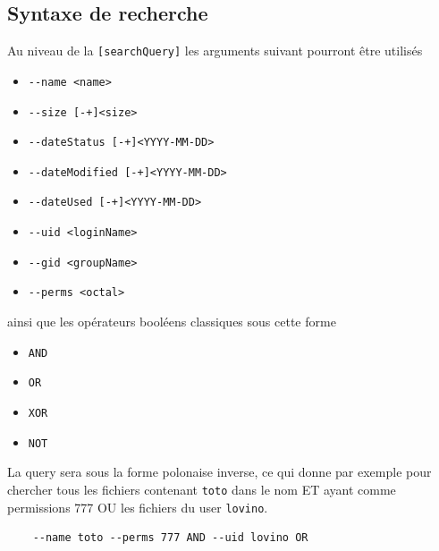 \documentclass[a4paper]{article}
\begin{document}
\subsection{Syntaxe de recherche}
Au niveau de la \verb+[searchQuery]+ les arguments suivant pourront être utilisés
\begin{itemize}
	\item \verb/--name <name>/
	\item \verb/--size [-+]<size>/
	\item \verb/--dateStatus [-+]<YYYY-MM-DD>/
	\item \verb/--dateModified [-+]<YYYY-MM-DD>/
	\item \verb/--dateUsed [-+]<YYYY-MM-DD>/
	\item \verb/--uid <loginName>/
	\item \verb/--gid <groupName>/
	\item \verb/--perms <octal>/
\end{itemize}
ainsi que les opérateurs booléens classiques sous cette forme
\begin{itemize}
	\item \verb+AND+
	\item \verb+OR+
	\item \verb+XOR+
	\item \verb+NOT+
\end{itemize}

La query sera sous la forme polonaise inverse, ce qui donne par exemple pour chercher tous les fichiers contenant \verb+toto+ dans le nom ET ayant comme permissions 777 OU les fichiers du user \verb+lovino+.
\begin{verbatim}
	--name toto --perms 777 AND --uid lovino OR
\end{verbatim}
\end{document}
